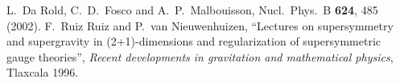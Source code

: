 \documentclass[a4paper,12pt]{article}
\begin{document}
\begin{thebibliography}{99}
L.~Da Rold, C.~D.~Fosco and A.~P.~Malbouisson,
Nucl.\ Phys.\ B {\bf 624}, 485 (2002).
F.~Ruiz Ruiz and P.~van Nieuwenhuizen,
``Lectures on supersymmetry and supergravity in (2+1)-dimensions and regularization of supersymmetric gauge theories'', {\em Recent developments in gravitation 
and mathematical physics}, Tlaxcala 1996.
\end{thebibliography}
\end{document}
